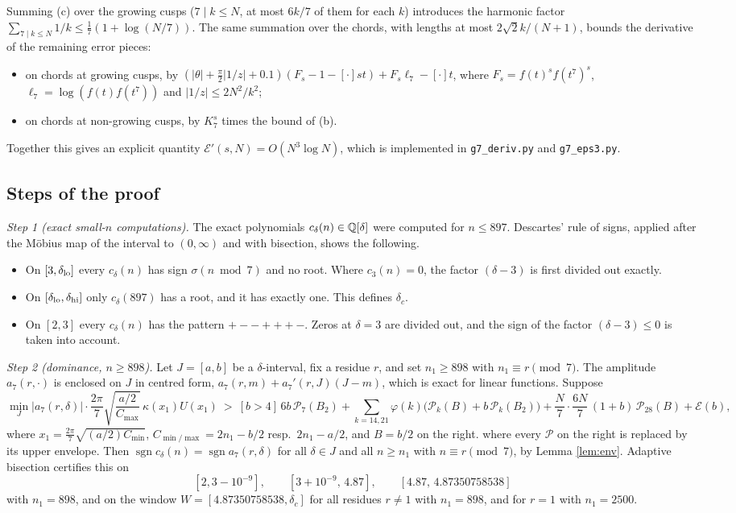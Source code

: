 \documentclass[11pt]{amsart}
\theoremstyle{remark}
\newcommand{\cP}{\mathcal P}\newcommand{\cE}{\mathcal E}\newcommand{\e}{\mathrm e}
\newcommand{\sgn}{\operatorname{sgn}}\newcommand{\Arg}{\operatorname{Arg}}
\begin{document}
Summing (c) over the growing cusps ($7\mid k\le N$, at most $6k/7$ of them for each $k$) introduces the harmonic factor $\sum_{7\mid k\le N}1/k\le\frac17(1+\log(N/7))$. The same summation over the chords, with lengths at most $2\sqrt2k/(N+1)$, bounds the derivative of the remaining error pieces:
\begin{itemize}[leftmargin=2em]
\item on chords at growing cusps, by $(|\theta|+\frac\pi2|1/z|+0.1)(F_s-1-[\cdot]st)+F_s\ell_7-[\cdot]t$, where $F_s=f(t)^sf(t^7)^s$, $\ell_7=\log(f(t)f(t^7))$ and $|1/z|\le2N^2/k^2$;
\item on chords at non-growing cusps, by $K_7^s$ times the bound of (b).
\end{itemize}
Together this gives an explicit quantity $\cE'(s,N)=O(N^3\log N)$, which is implemented in \texttt{g7\_deriv.py} and \texttt{g7\_eps3.py}.

\subsection{Steps of the proof}
\emph{Step 1 (exact small-$n$ computations).} The exact polynomials $c_\delta(n)\in\mathbb Q[\delta]$ were computed for $n\le897$. Descartes' rule of signs, applied after the M\"obius map of the interval to $(0,\infty)$ and with bisection, shows the following.
\begin{itemize}[leftmargin=2em]
\item On $[3,\delta_{\rm lo}]$ every $c_\delta(n)$ has sign $\sigma(n\bmod7)$ and no root. Where $c_3(n)=0$, the factor $(\delta-3)$ is first divided out exactly.
\item On $[\delta_{\rm lo},\delta_{\rm hi}]$ only $c_\delta(897)$ has a root, and it has exactly one. This defines $\delta_c$.
\item On $[2,3]$ every $c_\delta(n)$ has the pattern $+--+++-$. Zeros at $\delta=3$ are divided out, and the sign of the factor $(\delta-3)\le0$ is taken into account.
\end{itemize}

\emph{Step 2 (dominance, $n\ge898$).} Let $J=[a,b]$ be a $\delta$-interval, fix a residue $r$, and set $n_1\ge898$ with $n_1\equiv r\pmod 7$. The amplitude $a_7(r,\cdot)$ is enclosed on $J$ in centred form, $a_7(r,m)+a_7'(r,J)(J-m)$, which is exact for linear functions. Suppose
\[
\min_J|a_7(r,\delta)|\cdot\frac{2\pi}7\sqrt{\frac{a/2}{C_{\max}}}\,\kappa(x_1)U(x_1)\ >\ [b>4]\,6b\,\cP_7(B_2)+\sum_{k=14,21}\varphi(k)\big(\cP_k(B)+b\,\cP_k(B_2)\big)+\frac N7\cdot\frac{6N}7\,(1+b)\,\cP_{28}(B)+\cE(b),
\]
where $x_1=\frac{2\pi}7\sqrt{(a/2)C_{\min}}$, $C_{\min/\max}=2n_1-b/2$ resp.\ $2n_1-a/2$, and $B=b/2$ on the right.
where every $\cP$ on the right is replaced by its upper envelope. Then $\sgn c_\delta(n)=\sgn a_7(r,\delta)$ for all $\delta\in J$ and all $n\ge n_1$ with $n\equiv r\pmod 7$, by Lemma \ref{lem:env}. Adaptive bisection certifies this on
\[
[2,3-10^{-9}],\qquad [3+10^{-9},\,4.87],\qquad [4.87,\,4.87350758538]
\]
with $n_1=898$, and on the window $W=[4.87350758538,\delta_c]$ for all residues $r\neq1$ with $n_1=898$, and for $r=1$ with $n_1=2500$.
\end{document}
